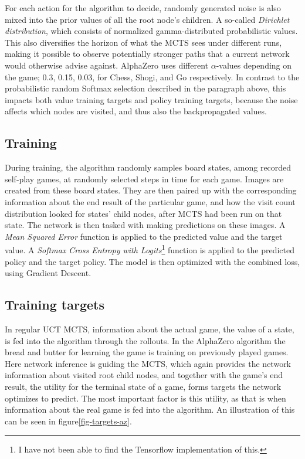 For each action for the algorithm to decide, randomly generated noise is also mixed into the prior values of all the root node's children. A so-called \textit{Dirichlet distribution}, which consists of normalized gamma-distributed probabilistic values. This also diversifies the horizon of what the MCTS sees under different runs, making it possible to observe potentially stronger paths that a current network would otherwise advise against. AlphaZero uses different $\alpha$-values depending on the game; 0.3, 0.15, 0.03, for Chess, Shogi, and Go respectively. In contrast to the probabilistic random Softmax selection described in the paragraph above, this impacts both value training targets and policy training targets, because the noise affects which nodes are visited, and thus also the backpropagated values\cite{Silver2018}.

\subsection{Training}
During training, the algorithm randomly samples board states, among recorded self-play games, at randomly selected steps in time for each game. Images are created from these board states. They are then paired up with the corresponding information about the end result of the particular game, and how the visit count distribution looked for states' child nodes, after MCTS had been run on that state. The network is then tasked with making predictions on these images. A \textit{Mean Squared Error} function is applied to the predicted value and the target value. A \textit{Softmax Cross Entropy with Logits}\footnote{I have not been able to find the Tensorflow implementation of this.} function is applied to the predicted policy and the target policy. The model is then optimized with the combined loss, using Gradient Descent.

\subsection{Training targets}
In regular UCT MCTS, information about the actual game, the value of a state, is fed into the algorithm through the rollouts. In the AlphaZero algorithm the bread and butter for learning the game is training on previously played games. Here network inference is guiding the MCTS, which again provides the network information about visited root child nodes, and together with the game's end result, the utility for the terminal state of a game, forms targets the network optimizes to predict. The most important factor is this utility, as that is when information about the real game is fed into the algorithm. An illustration of this can be seen in figure\ref{fig-targets-az}.

